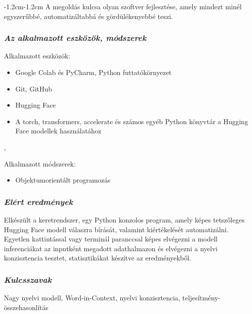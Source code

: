 \documentclass[12pt]{report}
\begin{document}
\begin{adjustwidth}{-1.2cm}{-1.2cm}
    A megoldás kulcsa olyan szoftver fejlesztése, amely mindezt minél egyszerűbbé, automatizáltabbá és gördülékenyebbé teszi.



    \subsubsection{\textit{Az alkalmazott eszközök, módszerek}}

    Alkalmazott eszközök:
    \begin{itemize}
        \item Google Colab és PyCharm, Python futtatókörnyezet
        \item Git, GitHub
        \item Hugging Face
        \item A torch, transformers, accelerate és számos egyéb Python könyvtár a Hugging Face modellek használatához
    \end{itemize},

    Alkalmazott módszerek:
    \begin{itemize}
        \item Objektumorientált programozás
    \end{itemize}

    \subsubsection{\textit{Elért eredmények}}

    Elkészült a keretrendszer, egy Python konzolos program, amely képes tetszőleges Hugging Face modell válaszra bírását, valamint kiértékelését automatizálni.
    Egyetlen kattintással vagy terminál paranccsal képes elvégezni a modell inferenciákat az inputként megadott adathalmazon és elvégezni a nyelvi konzisztencia tesztet, statisztikákat készítve az eredményekből.

    \subsubsection{\textit{Kulcsszavak}}

    Nagy nyelvi modell, Word-in-Context, nyelvi konzisztencia, teljesítmény-összehasonlítás
    \endgroup
    \end{adjustwidth}
    \newpage
\end{document}
